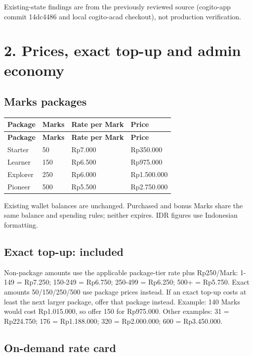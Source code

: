 \documentclass[11pt,a4paper]{article}
\begin{document}
Existing-state findings are from the previously reviewed source (cogito-app commit 14dc4486 and local cogito-acad checkout), not production verification.

\section*{2. Prices, exact top-up and admin economy}

\subsection*{Marks packages}

{\small
\begin{longtable}{|L{23.56mm}|L{41.23mm}|L{41.23mm}|L{41.23mm}|}
\hline
\textbf{Package} & \textbf{Marks} & \textbf{Rate per Mark} & \textbf{Price} \\ \hline
\endfirsthead
\hline
\textbf{Package} & \textbf{Marks} & \textbf{Rate per Mark} & \textbf{Price} \\ \hline
\endhead
Starter & 50 & Rp7.000 & Rp350.000 \\ \hline
Learner & 150 & Rp6.500 & Rp975.000 \\ \hline
Explorer & 250 & Rp6.000 & Rp1.500.000 \\ \hline
Pioneer & 500 & Rp5.500 & Rp2.750.000 \\ \hline
\end{longtable}
}

Existing wallet balances are unchanged. Purchased and bonus Marks share the same balance and spending rules; neither expires. IDR figures use Indonesian formatting.

\subsection*{Exact top-up: included}

Non-package amounts use the applicable package-tier rate plus Rp250/\allowbreak{}Mark: 1-149 = Rp7.250; 150-249 = Rp6.750; 250-499 = Rp6.250; 500+ = Rp5.750. Exact amounts 50/\allowbreak{}150/\allowbreak{}250/\allowbreak{}500 use package prices instead. If an exact top-up costs at least the next larger package, offer that package instead. Example: 140 Marks would cost Rp1.015.000, so offer 150 for Rp975.000. Other examples: 31 = Rp224.750; 176 = Rp1.188.000; 320 = Rp2.000.000; 600 = Rp3.450.000.

\subsection*{On-demand rate card}
\end{document}
